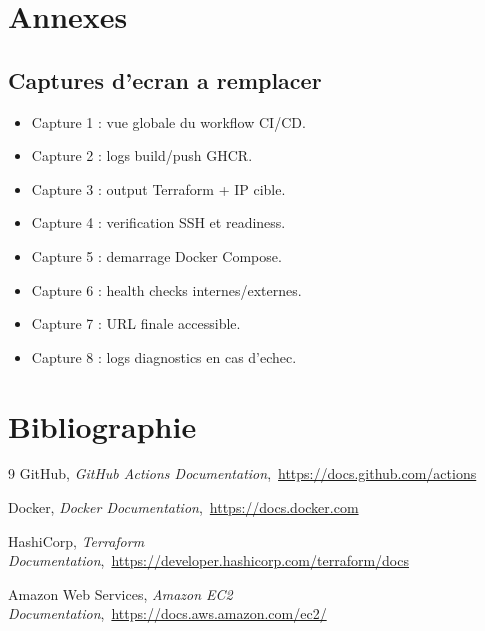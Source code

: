 \documentclass[12pt,a4paper]{report}
\begin{document}
\appendix
\chapter{Annexes}
\section{Captures d'ecran a remplacer}
\begin{itemize}
  \item Capture 1 : vue globale du workflow CI/CD.
  \item Capture 2 : logs build/push GHCR.
  \item Capture 3 : output Terraform + IP cible.
  \item Capture 4 : verification SSH et readiness.
  \item Capture 5 : demarrage Docker Compose.
  \item Capture 6 : health checks internes/externes.
  \item Capture 7 : URL finale accessible.
  \item Capture 8 : logs diagnostics en cas d'echec.
\end{itemize}

\chapter*{Bibliographie}
\begin{thebibliography}{9}
  GitHub, \textit{GitHub Actions Documentation},\
  \url{https://docs.github.com/actions}

  Docker, \textit{Docker Documentation},\
  \url{https://docs.docker.com}

  HashiCorp, \textit{Terraform Documentation},\
  \url{https://developer.hashicorp.com/terraform/docs}

  \bibitem{aws}
  Amazon Web Services, \textit{Amazon EC2 Documentation},\
  \url{https://docs.aws.amazon.com/ec2/}
\end{thebibliography}
\end{document}
